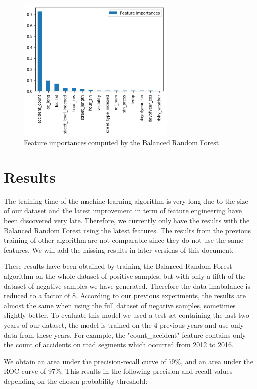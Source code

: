 \documentclass[conference]{IEEEtran}
\begin{document}
\begin{figure}[htbp]
\centerline{\includegraphics[height=7cm, keepaspectratio]{figures/feature_importances.png}}
\caption{Feature importances computed by the Balanced Random Forest}
\label{fig}
\end{figure}

\section{Results}
The training time of the machine learning algorithm is very long due to the size of our dataset and the latest improvement in term of feature engineering have been discovered very late. Therefore, we currently only have the results with the Balanced Random Forest using the latest features. The results from the previous training of other algorithm are not comparable since they do not use the same features. We will add the missing results in later versions of this document. 

These results have been obtained by training the Balanced Random Forest algorithm on the whole dataset of positive samples, but with only a fifth of the dataset of negative samples we have generated. Therefore the data imabalance is reduced to a factor of 8. According to our previous experiments, the results are almost the same when using the full dataset of negative samples, sometimes slightly better. To evaluate this model we used a test set containing the last two years of our dataset, the model is trained on the 4 previous years and use only data from these years. For example, the "count\_accident" feature contains only the count of accidents on road segments which occurred from 2012 to 2016.

We obtain an area under the precision-recall curve of 79\%, and an area under the ROC curve of 97\%.
This results in the following precision and recall values depending on the chosen probability threshold:
\end{document}
